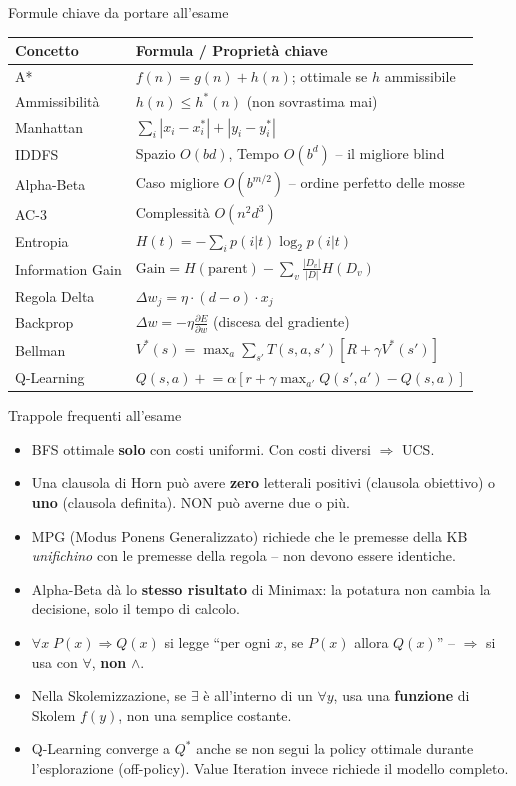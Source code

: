 \documentclass[12pt,a4paper]{article}
\begin{document}
\begin{ricorda}{Formule chiave da portare all'esame}
\begin{center}
\renewcommand{\arraystretch}{1.5}
\begin{tabular}{ll}
\toprule
\textbf{Concetto} & \textbf{Formula / Proprietà chiave} \\
\midrule
A* & $f(n) = g(n) + h(n)$; ottimale se $h$ ammissibile \\
Ammissibilità & $h(n) \leq h^*(n)$ (non sovrastima mai) \\
Manhattan & $\sum_i |x_i-x_i^*|+|y_i-y_i^*|$ \\
IDDFS & Spazio $O(bd)$, Tempo $O(b^d)$ -- il migliore blind \\
Alpha-Beta & Caso migliore $O(b^{m/2})$ -- ordine perfetto delle mosse \\
AC-3 & Complessità $O(n^2 d^3)$ \\
Entropia & $H(t) = -\sum_i p(i|t)\log_2 p(i|t)$ \\
Information Gain & $\text{Gain} = H(\text{parent}) - \sum_v \frac{|D_v|}{|D|} H(D_v)$ \\
Regola Delta & $\Delta w_j = \eta \cdot (d-o) \cdot x_j$ \\
Backprop & $\Delta w = -\eta \frac{\partial E}{\partial w}$ (discesa del gradiente) \\
Bellman & $V^*(s) = \max_a \sum_{s'} T(s,a,s')[R + \gamma V^*(s')]$ \\
Q-Learning & $Q(s,a) \mathrel{+}= \alpha[r + \gamma\max_{a'}Q(s',a') - Q(s,a)]$ \\
\bottomrule
\end{tabular}
\end{center}
\end{ricorda}

\begin{ricorda}{Trappole frequenti all'esame}
\begin{itemize}[noitemsep]
  \item BFS ottimale \textbf{solo} con costi uniformi. Con costi diversi $\Rightarrow$ UCS.
  \item Una clausola di Horn può avere \textbf{zero} letterali positivi (clausola obiettivo) o \textbf{uno} (clausola definita). NON può averne due o più.
  \item MPG (Modus Ponens Generalizzato) richiede che le premesse della KB \emph{unifichino} con le premesse della regola -- non devono essere identiche.
  \item Alpha-Beta dà lo \textbf{stesso risultato} di Minimax: la potatura non cambia la decisione, solo il tempo di calcolo.
  \item $\forall x \; P(x) \Rightarrow Q(x)$ si legge ``per ogni $x$, se $P(x)$ allora $Q(x)$'' -- $\Rightarrow$ si usa con $\forall$, \textbf{non} $\land$.
  \item Nella Skolemizzazione, se $\exists$ è all'interno di un $\forall y$, usa una \textbf{funzione} di Skolem $f(y)$, non una semplice costante.
  \item Q-Learning converge a $Q^*$ anche se non segui la policy ottimale durante l'esplorazione (off-policy). Value Iteration invece richiede il modello completo.
\end{itemize}
\end{ricorda}
\end{document}
